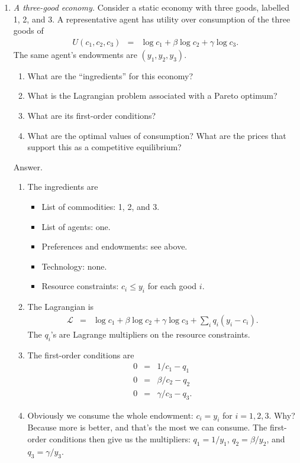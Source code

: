 \documentclass[11pt]{article}
\begin{document}
\begin{enumerate}
\item {\it A three-good economy.\/}
Consider a static economy with three goods,
labelled 1, 2, and 3.
A representative agent has utility over consumption
of the three goods of
\begin{eqnarray*}
    U(c_1,c_2, c_3) &=& \log c_1 + \beta \log c_2 + \gamma \log c_3 .
\end{eqnarray*}
The same agent's endowments are $(y_1, y_2, y_3)$.
\begin{enumerate}
\item What are the ``ingredients'' for this economy?
\item What is the Lagrangian problem associated with a Pareto optimum?
\item What are its first-order conditions?
\item What are the optimal values of consumption?
What are the prices that support this as a competitive equilibrium?
\end{enumerate}
%
Answer.
\begin{enumerate}
\item The ingredients are
\begin{itemize}
\item List of commodities:  1, 2, and 3.
\item List of agents:  one.
\item Preferences and endowments:  see above.
\item Technology:  none.
\item Resource constraints:  $c_i \leq y_i$ for each good $i$.
\end{itemize}
\item The Lagrangian is
\begin{eqnarray*}
    \mathcal{L} &=& \log c_1 + \beta \log c_2 + \gamma \log c_3
            + \sum_i q_i (y_i - c_i) .
\end{eqnarray*}
The $q_i$'s are Lagrange multipliers on the resource constraints.
\item The first-order conditions are
\begin{eqnarray*}
    0 &=& 1/c_1 - q_1  \\
    0 &=& \beta/c_2 - q_2 \\
    0 &=& \gamma/c_3 - q_3 .
\end{eqnarray*}
\item Obviously we consume the whole endowment:  $c_i = y_i$ for $i=1,2,3$.
Why?  Because more is better, and that's the most we can consume.
The first-order conditions then give us the multipliers:
$ q_1 = 1/y_1$, $q_2 = \beta/y_2$, and $q_3 = \gamma/y_3 $.
\end{enumerate}


\end{enumerate}
\end{document}
